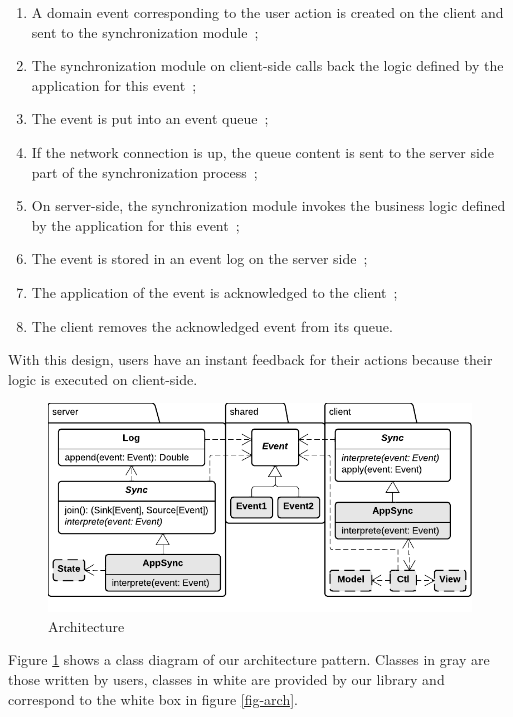 \documentclass{llncs}
\begin{document}
\begin{enumerate}
 \item A domain event corresponding to the user action is created on the client and sent to the synchronization module~;
 \item The synchronization module on client-side calls back the logic defined by the application for this event~;
 \item The event is put into an event queue~;
 \item If the network connection is up, the queue content is sent to the server side part of the synchronization process~;
 \item On server-side, the synchronization module invokes the business logic defined by the application for this event~;
 \item The event is stored in an event log on the server side~;
 \item The application of the event is acknowledged to the client~;
 \item The client removes the acknowledged event from its queue.
\end{enumerate}

With this design, users have an instant feedback for their actions because their logic is executed on client-side.


\begin{figure}
\centering
\includegraphics[width=12cm]{classes2.pdf}
\caption{Architecture}
\label{fig-classes-2}
\end{figure}

Figure \ref{fig-classes-2} shows a class diagram of our architecture pattern. Classes in gray are those written by users, classes in white are provided by our library and correspond to the white box in figure \ref{fig-arch}.
\end{document}

